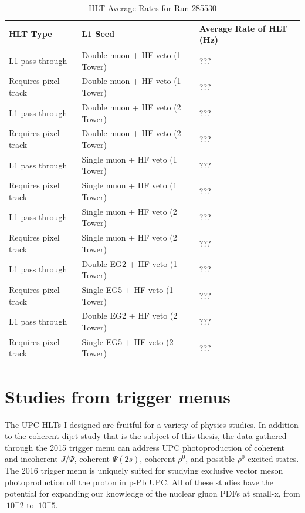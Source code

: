 \begin{table}[h!]
\centering
\caption{HLT Average Rates for Run 285530}
\label{my-label}
\begin{tabular}{@{}lll@{}}
\toprule
HLT Type             & L1 Seed                           & Average Rate of HLT (Hz) \\ \midrule
L1 pass through      & Double muon + HF veto (1 Tower) & ???                     \\
Requires pixel track & Double muon + HF veto (1 Tower) & ???                     \\
L1 pass through      & Double muon + HF veto (2 Tower) & ???                     \\
Requires pixel track & Double muon + HF veto (2 Tower) & ???                     \\
L1 pass through      & Single muon + HF veto (1 Tower) & ???                    \\
Requires pixel track & Single muon + HF veto (1 Tower) & ???                    \\
L1 pass through      & Single muon + HF veto (2 Tower) & ???                    \\
Requires pixel track & Single muon + HF veto (2 Tower) & ???                    \\
L1 pass through      & Double EG2 + HF veto (1 Tower)  & ???                     \\
Requires pixel track & Single EG5 + HF veto (1 Tower)  & ???                     \\
L1 pass through      & Double EG2 + HF veto (2 Tower)  & ???                     \\
Requires pixel track & Single EG5 + HF veto (2 Tower)  & ???                     \\ \bottomrule
\end{tabular}
\end{table}

\section{Studies from trigger menus}

The UPC HLTs I designed are fruitful for a variety of physics studies. In addition to the coherent dijet study that is the subject of this thesis, the data gathered through the 2015 trigger menu can address UPC photoproduction of coherent and incoherent $J/\Psi$, coherent $\Psi(2s)$, coherent $\rho^0$, and possible $\rho^0$ excited states. The 2016 trigger menu is uniquely suited for studying exclusive vector meson photoproduction off the proton in p-Pb UPC. All of these studies have the potential for expanding our knowledge of the nuclear gluon PDFs at small-x, from $~10^-2$ to $~10^-5$.  
